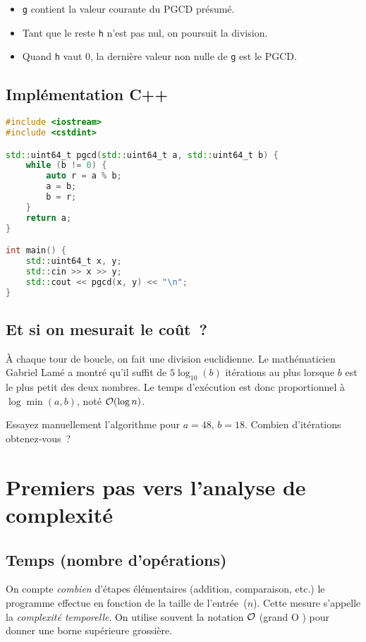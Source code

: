 \begin{itemize}
  \item \texttt{g} contient la valeur courante du PGCD présumé.
  \item Tant que le reste \texttt{h} n’est pas nul, on poursuit la division.
  \item Quand \texttt{h} vaut 0, la dernière valeur non nulle de \texttt{g} est
        le PGCD.
\end{itemize}

\subsection{Implémentation C++}
\begin{lstlisting}[language=C++,caption=euclid.cpp]
#include <iostream>
#include <cstdint>

std::uint64_t pgcd(std::uint64_t a, std::uint64_t b) {
    while (b != 0) {
        auto r = a % b;
        a = b;
        b = r;
    }
    return a;
}

int main() {
    std::uint64_t x, y;
    std::cin >> x >> y;
    std::cout << pgcd(x, y) << "\n";
}
\end{lstlisting}

\subsection{Et si on mesurait le coût ?}
À chaque tour de boucle, on fait une division euclidienne. Le mathématicien
Gabriel Lamé a montré qu’il suffit de \(5\log_{10}(b)\) itérations au plus
lorsque \(b\) est le plus petit des deux nombres. Le temps d’exécution est donc
proportionnel à \(\log \min(a, b)\), noté $\mathcal{O}(\log n)$.

\begin{reflexion}
Essayez manuellement l’algorithme pour \(a = 48,\, b = 18\). Combien
d’itérations obtenez‑vous ?
\end{reflexion}

\section{Premiers pas vers l’analyse de complexité}

\subsection{Temps (nombre d’opérations)}
On compte \emph{combien} d’étapes élémentaires (addition, comparaison, etc.)
le programme effectue en fonction de la taille de l’entrée (\(n\)). Cette mesure
s’appelle la \emph{complexité temporelle}. On utilise souvent la notation
$\mathcal{O}$ (\og grand O \fg) pour donner une borne supérieure grossière.

